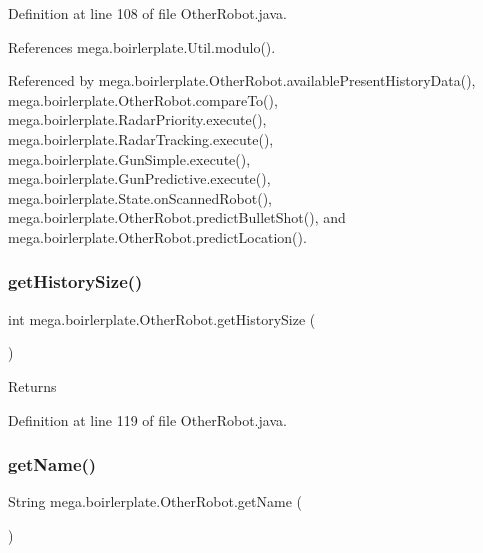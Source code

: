 Definition at line 108 of file Other\+Robot.\+java.



References mega.\+boirlerplate.\+Util.\+modulo().



Referenced by mega.\+boirlerplate.\+Other\+Robot.\+available\+Present\+History\+Data(), mega.\+boirlerplate.\+Other\+Robot.\+compare\+To(), mega.\+boirlerplate.\+Radar\+Priority.\+execute(), mega.\+boirlerplate.\+Radar\+Tracking.\+execute(), mega.\+boirlerplate.\+Gun\+Simple.\+execute(), mega.\+boirlerplate.\+Gun\+Predictive.\+execute(), mega.\+boirlerplate.\+State.\+on\+Scanned\+Robot(), mega.\+boirlerplate.\+Other\+Robot.\+predict\+Bullet\+Shot(), and mega.\+boirlerplate.\+Other\+Robot.\+predict\+Location().

\mbox{\label{classmega_1_1boirlerplate_1_1_other_robot_a68bd829755128ad948aae09221c9e9b0}} 
\subsubsection{\texorpdfstring{get\+History\+Size()}{getHistorySize()}}
{\footnotesize\ttfamily int mega.\+boirlerplate.\+Other\+Robot.\+get\+History\+Size (\begin{DoxyParamCaption}{ }\end{DoxyParamCaption})}

\begin{DoxyReturn}{Returns}

\end{DoxyReturn}


Definition at line 119 of file Other\+Robot.\+java.

\mbox{\label{classmega_1_1boirlerplate_1_1_other_robot_af03b8dad14cd72302d3d3edfb6d0fce6}} 
\subsubsection{\texorpdfstring{get\+Name()}{getName()}}
{\footnotesize\ttfamily String mega.\+boirlerplate.\+Other\+Robot.\+get\+Name (\begin{DoxyParamCaption}{ }\end{DoxyParamCaption})}

